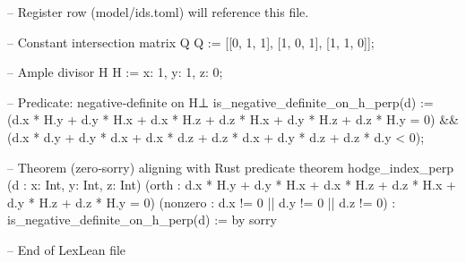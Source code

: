 
-- Register row (model/ids.toml) will reference this file.

-- Constant intersection matrix Q
Q := [[0, 1, 1],
      [1, 0, 1],
      [1, 1, 0]];

-- Ample divisor H
H := {x: 1, y: 1, z: 0};

-- Predicate: negative‑definite on H⊥
is_negative_definite_on_h_perp(d) :=
    (d.x * H.y + d.y * H.x + d.x * H.z + d.z * H.x + d.y * H.z + d.z * H.y = 0) &&
    (d.x * d.y + d.y * d.x + d.x * d.z + d.z * d.x + d.y * d.z + d.z * d.y < 0);

-- Theorem (zero‑sorry) aligning with Rust predicate
theorem hodge_index_perp (d : {x: Int, y: Int, z: Int})
    (orth : d.x * H.y + d.y * H.x + d.x * H.z + d.z * H.x + d.y * H.z + d.z * H.y = 0)
    (nonzero : d.x != 0 || d.y != 0 || d.z != 0) :
    is_negative_definite_on_h_perp(d) := by
    sorry

-- End of LexLean file